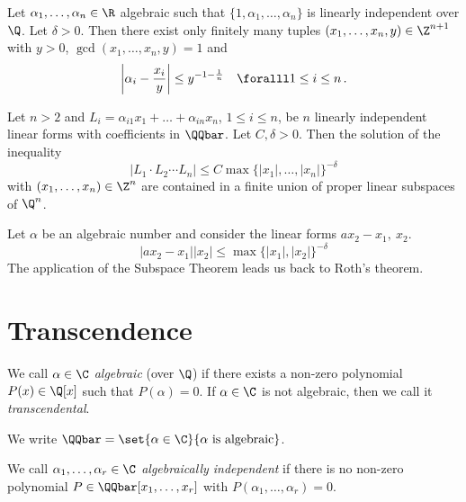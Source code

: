\begin{thm*}
	Let \( \alpha_1, \dotsc, \alpha_n \in \R \) algebraic such that \( \{1, \alpha_1, \dotsc, \alpha_n\} \) is linearly independent over \( \Q \).
	Let \( \delta > 0 \).
	Then there exist only finitely many tuples \( (x_1, \dotsc, x_n, y) \in \Z^{n+1} \) with \( y>0 \), \( \gcd(x_1, \dotsc, x_n, y)=1 \) and
	\[ \left| \alpha_i - \frac{x_i}{y} \right| \leq y^{-1 - \frac{1}{n}} \quad \foralll 1 \leq i \leq n \,. \]
\end{thm*}

\begin{thm*}
	Let \( n>2 \) and \( L_i = \alpha_{i1} x_1 + \dots + \alpha_{in}x_n \), \( 1 \leq i \leq n \), be \( n \) linearly independent linear forms with coefficients in \( \QQbar \).
	Let \( C, \delta > 0 \).
	Then the solution of the inequality
	\[ \left| L_1 \cdot L_2 \dotsm L_n \right| \leq C \max \{|x_1|, \dotsc, |x_n|\}^{-\delta} \]
	with \( (x_1, \dotsc, x_n) \in \Z^n \) are contained in a finite union of proper linear subspaces of \( \Q^n \).
\end{thm*}

\begin{exmp*}
	Let \( \alpha \) be an algebraic number and consider the linear forms \( ax_2 - x_1,\ x_2 \).
	\[ |ax_2 - x_1| |x_2| \leq \max \{|x_1|, |x_2|\}^{-\delta} \]
	The application of the Subspace Theorem leads us back to Roth's theorem.
\end{exmp*}


\section{Transcendence}\label{sec:4.2}

\begin{defn*}
	We call \( \alpha \in \C \) \emph{algebraic} (over \( \Q \)) if there exists a non-zero polynomial \( P(x) \in \Q[x] \) such that \( P(\alpha) = 0 \).
	If \( \alpha \in \C \) is not algebraic, then we call it \emph{transcendental}.
\end{defn*}

\begin{notat*}
	We write \( \QQbar = \set{\alpha \in \C}{\alpha \ \text{is algebraic}} \).
\end{notat*}

\begin{defn*}
	We call \( \alpha_1, \dotsc, \alpha_r \in \C \) \emph{algebraically independent} if there is no non-zero polynomial \( P \in \QQbar[x_1, \dotsc, x_r] \) with \( P(\alpha_1, \dotsc, \alpha_r) = 0 \).
\end{defn*}


